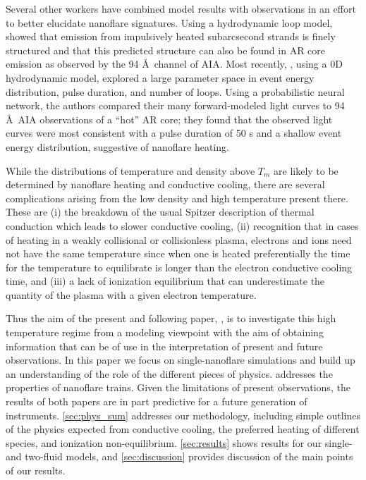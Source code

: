 \documentclass[apj]{emulateapj}
\newcommand{\ang}{\AA~}
\begin{document}
%
	\par Several other workers have combined model results with observations in an effort to better elucidate nanoflare signatures. Using a hydrodynamic loop model, \citet{reale_solar_2011} showed that emission from impulsively heated subarcsecond strands is finely structured and that this predicted structure can also be found in AR core emission as observed by the 94 \ang channel of AIA. Most recently, \citet{tajfirouze_time-resolved_2016}, using a 0D hydrodynamic model, explored a large parameter space in event energy distribution, pulse duration, and number of loops. Using a probabilistic neural network, the authors compared their many forward-modeled light curves to 94 \ang AIA observations of a ``hot'' AR core; they found that the observed light curves were most consistent with a pulse duration of 50 s and a shallow event energy distribution, suggestive of nanoflare heating.
%
	\par While the distributions of temperature and density above $T_m$ are likely to be determined by nanoflare heating and conductive cooling, there are several complications arising from the low density and high temperature present there. These are (i) the breakdown of the usual Spitzer description of thermal conduction which leads to slower conductive cooling, (ii) recognition that in cases of heating in a weakly collisional or collisionless plasma, electrons and ions need not have the same temperature since when one is heated preferentially the time for the temperature to equilibrate is longer than the electron conductive cooling time, and (iii) a lack of ionization equilibrium that can underestimate the quantity of the plasma with a given electron temperature.
%
	\par Thus the aim of the present and following paper, \citet[in preparation]{barnes_inference_2016-1} , is to investigate this high temperature regime from a modeling viewpoint with the aim of obtaining information that can be of use in the interpretation of present and future observations. In this paper we focus on single-nanoflare simulations and build up an understanding of the role of the different pieces of physics.  addresses the properties of nanoflare trains. Given the limitations of present observations, the results of both papers are in part predictive for a future generation of instruments. \autoref{sec:phys_sum} addresses our methodology, including simple outlines of the physics expected from conductive cooling, the preferred heating of different species, and ionization non-equilibrium. \autoref{sec:results} shows results for our single- and two-fluid models, and \autoref{sec:discussion} provides discussion of the main points of our results.
\end{document}
